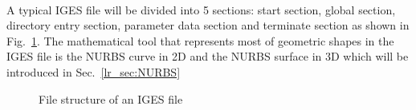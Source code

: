 \paragraph{}
A typical IGES file will be divided into 5 sections: start section, global section, directory entry section, parameter data section and terminate section as shown in Fig.~\ref{lr_fig:iges_data_form}.
The mathematical tool that represents most of geometric shapes in the IGES file is the NURBS curve in 2D and the NURBS surface in 3D which will be introduced in Sec.~\ref{lr_sec:NURBS}

%
\begin{figure}[!ht]
    \centering
    \caption{File structure of an IGES file}
    \label{lr_fig:iges_data_form}
\end{figure}

\paragraph{}
